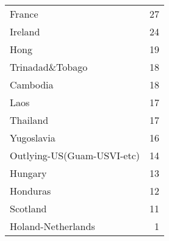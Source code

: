 \begin{tabular}{lr}
 France                     &              27 \\
 Ireland                    &              24 \\
 Hong                       &              19 \\
 Trinadad\&Tobago            &              18 \\
 Cambodia                   &              18 \\
 Laos                       &              17 \\
 Thailand                   &              17 \\
 Yugoslavia                 &              16 \\
 Outlying-US(Guam-USVI-etc) &              14 \\
 Hungary                    &              13 \\
 Honduras                   &              12 \\
 Scotland                   &              11 \\
 Holand-Netherlands         &               1 \\
\bottomrule
\end{tabular}
